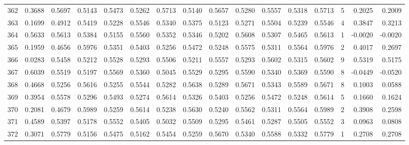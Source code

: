 \begin{tabular}{lrrrrrrrrrrrrrrr}
362 &      0.3688 &  0.5697 &  0.5143 &  0.5473 &  0.5262 &  0.5713 &  0.5140 &  0.5657 &  0.5280 &  0.5557 &   0.5318 &     0.5713 &      5 &                    0.2025 &                     0.2009 \\
363 &      0.1699 &  0.4912 &  0.5419 &  0.5228 &  0.5546 &  0.5340 &  0.5375 &  0.5123 &  0.5271 &  0.5504 &   0.5239 &     0.5546 &      4 &                    0.3847 &                     0.3213 \\
364 &      0.5633 &  0.5613 &  0.5384 &  0.5155 &  0.5560 &  0.5352 &  0.5346 &  0.5202 &  0.5608 &  0.5307 &   0.5465 &     0.5613 &      1 &                   -0.0020 &                    -0.0020 \\
365 &      0.1959 &  0.4656 &  0.5976 &  0.5351 &  0.5403 &  0.5256 &  0.5472 &  0.5248 &  0.5575 &  0.5311 &   0.5564 &     0.5976 &      2 &                    0.4017 &                     0.2697 \\
366 &      0.0283 &  0.5458 &  0.5212 &  0.5528 &  0.5293 &  0.5506 &  0.5211 &  0.5557 &  0.5293 &  0.5602 &   0.5315 &     0.5602 &      9 &                    0.5319 &                     0.5175 \\
367 &      0.6039 &  0.5519 &  0.5197 &  0.5569 &  0.5360 &  0.5045 &  0.5529 &  0.5295 &  0.5590 &  0.5340 &   0.5369 &     0.5590 &      8 &                   -0.0449 &                    -0.0520 \\
368 &      0.4668 &  0.5256 &  0.5616 &  0.5255 &  0.5544 &  0.5282 &  0.5638 &  0.5289 &  0.5671 &  0.5343 &   0.5589 &     0.5671 &      8 &                    0.1003 &                     0.0588 \\
369 &      0.3954 &  0.5578 &  0.5296 &  0.5493 &  0.5274 &  0.5614 &  0.5326 &  0.5403 &  0.5256 &  0.5472 &   0.5248 &     0.5614 &      5 &                    0.1660 &                     0.1624 \\
370 &      0.2081 &  0.4679 &  0.5989 &  0.5259 &  0.5614 &  0.5238 &  0.5630 &  0.5240 &  0.5562 &  0.5311 &   0.5564 &     0.5989 &      2 &                    0.3908 &                     0.2598 \\
371 &      0.4589 &  0.5397 &  0.5178 &  0.5552 &  0.5405 &  0.5032 &  0.5509 &  0.5295 &  0.5461 &  0.5287 &   0.5505 &     0.5552 &      3 &                    0.0963 &                     0.0808 \\
372 &      0.3071 &  0.5779 &  0.5156 &  0.5475 &  0.5162 &  0.5454 &  0.5259 &  0.5670 &  0.5340 &  0.5588 &   0.5332 &     0.5779 &      1 &                    0.2708 &                     0.2708 \\

\end{tabular}
